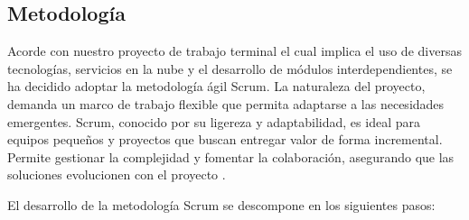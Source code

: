 \subsection{Metodología}

Acorde con nuestro proyecto de trabajo terminal el cual implica el uso de diversas tecnologías, servicios en la nube y
el desarrollo de módulos interdependientes, se ha decidido adoptar la metodología ágil Scrum. La naturaleza del
proyecto, demanda un marco de trabajo flexible que permita adaptarse a las necesidades emergentes. Scrum, conocido
por su ligereza y adaptabilidad, es ideal para equipos pequeños y proyectos que buscan entregar valor de forma
incremental. Permite gestionar la complejidad y fomentar la colaboración, asegurando que las soluciones evolucionen
con el proyecto \cite{sutherland2020scrum}.

El desarrollo de la metodología Scrum se descompone en los siguientes pasos:


